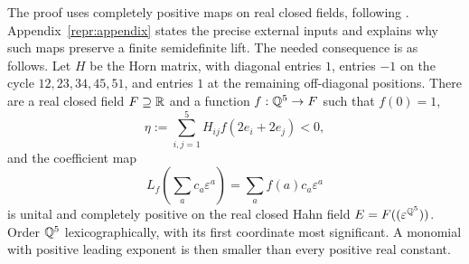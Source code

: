 The proof uses completely positive maps on real closed fields, following
\citet{BodirskyKummerThom2024}. Appendix~\ref{repr:appendix} states the precise
external inputs and explains why such maps preserve a finite semidefinite
lift. The needed consequence is as follows. Let $H$ be the Horn matrix, with
diagonal entries $1$, entries $-1$ on the cycle
$12,23,34,45,51$, and entries $1$ at the remaining off-diagonal positions.
There are a real closed field $F\supseteq\mathbb R$ and a function
$f:\mathbb Q^5\to F$ such that $f(0)=1$,
\begin{equation}\label{repr:negative-horn}
 \eta:=\sum_{i,j=1}^5 H_{ij}f(2e_i+2e_j)<0,
\end{equation}
and the coefficient map
\begin{equation}\label{repr:coefficient-map}
 L_f\left(\sum_a c_a\varepsilon^a\right)
 =\sum_a f(a)c_a\varepsilon^a
\end{equation}
is unital and completely positive on the real closed Hahn field
$E=F((\varepsilon^{\mathbb Q^5}))$. Order $\mathbb Q^5$ lexicographically, with its first
coordinate most significant. A monomial with positive leading exponent is
then smaller than every positive real constant.

